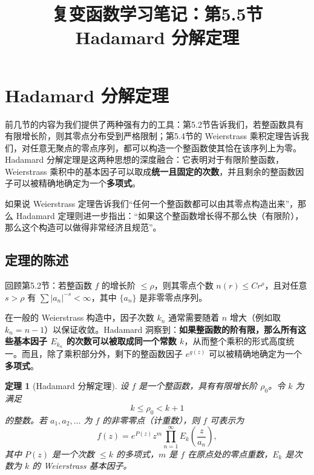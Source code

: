 \documentclass[UTF8]{ctexart}
\title{复变函数学习笔记：第5.5节 Hadamard 分解定理}
\author{}
\date{}
\newtheorem{theorem}{定理}[section]
\numberwithin{equation}{section}
\begin{document}
\maketitle

\section{Hadamard 分解定理}

前几节的内容为我们提供了两种强有力的工具：第5.2节告诉我们，若整函数具有有限增长阶，则其零点分布受到严格限制；第5.4节的 Weierstrass 乘积定理告诉我们，对任意无聚点的零点序列，都可以构造一个整函数使其恰在该序列上为零。Hadamard 分解定理是这两种思想的深度融合：它表明对于有限阶整函数，Weierstrass 乘积中的基本因子可以取成\textbf{统一且固定的次数}，并且剩余的整函数因子可以被精确地确定为一个\textbf{多项式}。

如果说 Weierstrass 定理告诉我们“任何一个整函数都可以由其零点构造出来”，那么 Hadamard 定理则进一步指出：“如果这个整函数增长得不那么快（有限阶），那么这个构造可以做得非常经济且规范”。

\subsection{定理的陈述}

回顾第5.2节：若整函数 \(f\) 的增长阶 \(\le \rho\)，则其零点个数 \(n(r) \le C r^\rho\)，且对任意 \(s > \rho\) 有 \(\sum |a_n|^{-s} < \infty\)，其中 \(\{a_n\}\) 是非零零点序列。

在一般的 Weierstrass 构造中，因子次数 \(k_n\) 通常需要随着 \(n\) 增大（例如取 \(k_n = n-1\)）以保证收敛。Hadamard 洞察到：\textbf{如果整函数的阶有限，那么所有这些基本因子 \(E_{k_n}\) 的次数可以被取成同一个常数 \(k\)}，从而整个乘积的形式高度统一。而且，除了乘积部分外，剩下的整函数因子 \(e^{g(z)}\) 可以被精确地确定为一个\textbf{多项式}。

\begin{theorem}[Hadamard 分解定理]\label{thm:hadamard}
设 \(f\) 是一个整函数，具有有限增长阶 \(\rho_0\)。令 \(k\) 为满足
\[
k \le \rho_0 < k+1
\]
的整数。若 \(a_1, a_2, \dots\) 为 \(f\) 的非零零点（计重数），则 \(f\) 可表示为
\begin{equation}\label{eq:hadamard}
f(z) = e^{P(z)} z^m \prod_{n=1}^\infty E_k\!\left(\frac{z}{a_n}\right),
\end{equation}
其中 \(P(z)\) 是一个次数 \(\le k\) 的多项式，\(m\) 是 \(f\) 在原点处的零点重数，\(E_k\) 是次数为 \(k\) 的 Weierstrass 基本因子。
\end{theorem}
\end{document}
